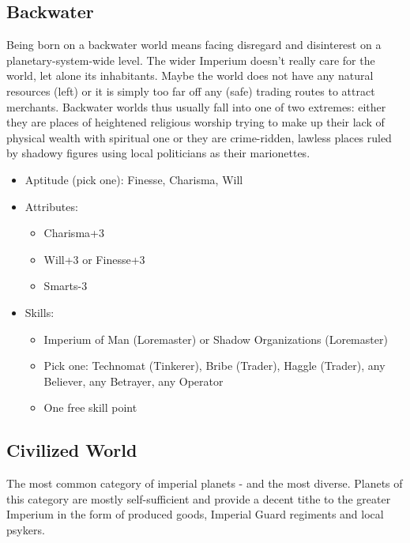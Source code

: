 	\subsection{Backwater}
	Being born on a backwater world means facing disregard and disinterest on a planetary-system-wide level. The wider Imperium doesn't really care for the world, let alone its inhabitants. Maybe the world does not have any natural resources (left) or it is simply too far off any (safe) trading routes to attract merchants. Backwater worlds thus usually fall into one of two extremes: either they are places of heightened religious worship trying to make up their lack of physical wealth with spiritual one or they are crime-ridden, lawless places ruled by shadowy figures using local politicians as their marionettes. 

	\begin{itemize}
		\item Aptitude (pick one): Finesse, Charisma, Will
		\item Attributes:
		\begin{itemize}
			\item Charisma+3
			\item Will+3 or Finesse+3
			\item Smarts-3
		\end{itemize}
		\item Skills: 
		\begin{itemize}
		 	\item Imperium of Man (Loremaster) or Shadow Organizations (Loremaster)
		 	\item Pick one: Technomat (Tinkerer), Bribe (Trader), Haggle (Trader), any Believer, any Betrayer, any Operator
		 	\item One free skill point
		 \end{itemize} 
	\end{itemize}


	\subsection{Civilized World}
	The most common category of imperial planets - and the most diverse. Planets of this category are mostly self-sufficient and provide a decent tithe to the greater Imperium in the form of produced goods, Imperial Guard regiments and local psykers.

